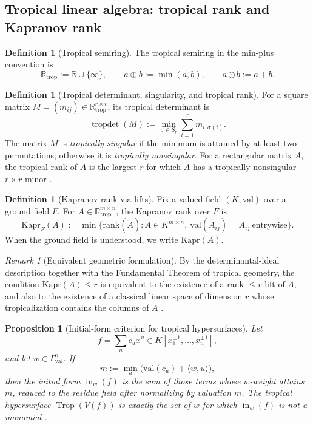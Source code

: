 \documentclass[11pt]{amsart}
\numberwithin{equation}{section}
\theoremstyle{plain}
\newtheorem{proposition}[theorem]{Proposition}
\theoremstyle{definition}
\newtheorem{definition}[theorem]{Definition}
\theoremstyle{remark}
\newtheorem{remark}[theorem]{Remark}
\newcommand{\Kapr}{\mathrm{Kapr}}
\newcommand{\rank}{\mathrm{rank}}
\newcommand{\val}{\mathrm{val}}
\newcommand{\RR}{\mathbb{R}}
\begin{document}


\subsection{Tropical linear algebra: tropical rank and Kapranov rank}
\begin{definition}[Tropical semiring]
The tropical semiring in the min-plus convention is
\[
\RR_{\mathrm{trop}}:=\RR\cup\{\infty\}, \qquad a\oplus b:=\min(a,b), \qquad a\odot b:=a+b.
\]
\end{definition}

\begin{definition}[Tropical determinant, singularity, and tropical rank]
For a square matrix $M=(m_{ij})\in \RR_{\mathrm{trop}}^{r\times r}$, its tropical determinant is
\[
\operatorname{tropdet}(M):=\min_{\sigma\in S_r}\sum_{i=1}^r m_{i,\sigma(i)}.
\]
The matrix $M$ is \emph{tropically singular} if the minimum is attained by at least two permutations; otherwise it is
\emph{tropically nonsingular}. For a rectangular matrix $A$, the tropical rank of $A$ is the largest $r$ for which $A$ has a tropically nonsingular $r\times r$ minor \cite{develinSantosSturmfels2005,joswig2021}.
\end{definition}

\begin{definition}[Kapranov rank via lifts]
Fix a valued field $(K,\val)$ over a ground field $F$. For $A\in \RR_{\mathrm{trop}}^{m\times n}$, the Kapranov rank over $F$ is
\[
\Kapr_F(A):=\min\bigl\{\rank(\widetilde A): \widetilde A\in K^{m\times n},\ \val(\widetilde A_{ij})=A_{ij}\ \text{entrywise}\bigr\}.
\]
When the ground field is understood, we write $\Kapr(A)$.
\end{definition}

\begin{remark}[Equivalent geometric formulation]
By the determinantal-ideal description together with the Fundamental Theorem of tropical geometry, the condition $\Kapr(A)\le r$ is
 equivalent to the existence of a rank-$\le r$ lift of $A$, and also to the existence of a classical linear space of dimension $r$ whose
 tropicalization contains the columns of $A$ \cite{develinSantosSturmfels2005,maclaganSturmfels2015,speyer2008}.
\end{remark}

\begin{proposition}[Initial-form criterion for tropical hypersurfaces]
Let
\[
f=\sum_u c_u x^u \in K[x_1^{\pm1},\dots,x_n^{\pm1}],
\]
and let $w\in\Gamma_{\val}^n$. If
\[
m:=\min_u\bigl(\val(c_u)+\langle w,u\rangle\bigr),
\]
then the initial form $\operatorname{in}_w(f)$ is the sum of those terms whose $w$-weight attains $m$, reduced to the residue field after
normalizing by valuation $m$. The tropical hypersurface $\operatorname{Trop}(V(f))$ is exactly the set of $w$ for which $\operatorname{in}_w(f)$ is not a
monomial \cite{maclaganSturmfels2015}.
\end{proposition}
\end{document}
